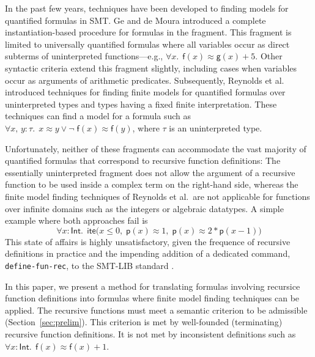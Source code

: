 \documentclass[runningheads,a4paper]{llncs}
\newcommand{\con}[1]{\mathsf{#1}}
\let\oldneg=\neg
\def\neg{\oldneg\;}
\let\oldvee=\vee
\def\vee{\mathrel{\oldvee}}
\newcommand{\teq}{\approx}
\newcommand{\typeint}{\ty{Int}}
\newcommand\ty[1]{\con{#1}}
\newcommand{\lite}{\con{ite}}
\newcommand{\vthinspace}{\kern+0.083333em}
\newcommand{\typ}[1]{^{\vthinspace #1}}
\begin{document}
In the past few years, techniques have been developed to finding models for
quantified formulas in SMT.
Ge and de Moura \cite{GeDeM-CAV-09} introduced a complete instantiation-based
procedure for formulas in the  fragment.
This fragment is limited to universally quantified formulas where all
variables occur as direct subterms of uninterpreted
functions---e.g., $\forall x%
.\;\, \con{f}( x )
\teq \con{g}( x ) + 5$.
Other syntactic criteria extend
this fragment slightly, including cases when variables occur as arguments of
arithmetic predicates. Subsequently, Reynolds et al.\
\cite{ReyEtAl-1-RR-13,reynolds-et-al-2013} introduced techniques for finding finite
models for quantified
formulas over uninterpreted types and types having a fixed finite
interpretation. %
These techniques can
find a model for a formula such as $\forall x,\, y : \tau.\;\, x \teq
y \vee \allowbreak \neg \con{f}( x ) \teq \con{f}( y )$, where $\tau$ is an uninterpreted type.

Unfortunately, neither of these fragments can accommodate the vast majority of
quantified formulas that correspond to recursive function definitions: The
essentially uninterpreted fragment does not allow the argument of a
recursive function to be used inside a complex term on the right-hand side,
whereas the finite model finding techniques of Reynolds et al.\ are not
applicable for functions over infinite domains such as the integers or
algebraic datatypes. A simple example where both approaches fail is
\begin{equation}\label{eq:pii}
\forall x : {\typeint}.\;\, \lite\bigl(
x \leq 0,\allowbreak\; \con{p}( x ) \teq 1,\allowbreak\; \con{p}( x ) \teq 2 * \con{p}( x - 1 ) \bigr)
\end{equation}
This state of affairs is highly unsatisfactory, given the frequence of
recursive definitions in practice and the impending addition of a dedicated
command, \texttt{define-fun-rec}, to the SMT-LIB standard \cite{smtlib25}.

In this paper, we present a method for translating formulas involving recursice function
definitions into formulas where finite model finding techniques can be applied.
The recursive functions must meet a semantic criterion to be admissible
(Section~\ref{sec:prelim}). This criterion is met by well-founded (terminating)
recursive function definitions. It is not met by inconsistent
definitions such as $\forall x : {\typeint}.\;\, \con{f}(x) \teq \con{f}(x) +
1$. %
\end{document}
